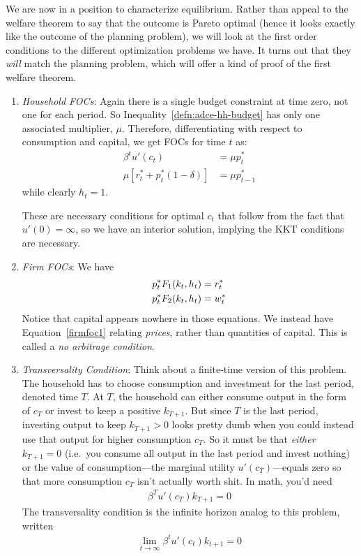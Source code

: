 \documentclass[12pt]{article}
\theoremstyle{plain}
\theoremstyle{definition}
\theoremstyle{remark}
\newcommand{\limt}{\lim_{t\rightarrow\infty}}
\begin{document}
We are now in a position to characterize equilibrium. Rather than appeal
to the welfare theorem to say that the outcome is Pareto optimal (hence
it looks exactly like the outcome of the planning problem), we will look
at the first order conditions to the different optimization problems we
have. It turns out that they \emph{will} match the planning problem,
which will offer a kind of proof of the first welfare theorem.
\begin{enumerate}
  \item \emph{Household FOCs}: Again there is a single budget
    constraint at time zero, not one for each period. So
    Inequality~\ref{defn:adce-hh-budget} has only one associated
    multiplier, $\mu$. Therefore, differentiating with respect to
    consumption and capital, we get FOCs for time $t$ as:
    \begin{align}
      \beta^t u'(c_t) &= \mu p_t^* \label{hhfoc1}\\
      \mu[r_t^* + p_t^* (1-\delta)]
      &= \mu p_{t-1}^* \label{hhfoc2}
    \end{align}
    while clearly $h_t=1$.

    These are necessary conditions for optimal $c_t$ that follow from
    the fact that $u'(0)=\infty$, so we have an interior solution,
    implying the KKT conditions are necessary.

  \item \emph{Firm FOCs}: We have
    \begin{align}
      p^*_t F_1(k_t,h_t) &= r_t^* \label{firmfoc1}\\
      p^*_t F_2(k_t,h_t) &= w_t^* \notag
    \end{align}
    Notice that capital appears nowhere in those equations.
    We instead have Equation~\ref{firmfoc1} relating \emph{prices},
    rather than quantities of capital. This is called a
    \emph{no arbitrage condition}.

  \item \emph{Transversality Condition}:
    Think about a finite-time version of this problem. The household has
    to choose consumption and investment for the last period, denoted
    time $T$. At $T$, the household can either consume output in the
    form of $c_T$ or invest to keep a positive $k_{T+1}$. But since $T$
    is the last period, investing output to keep $k_{T+1}>0$ looks
    pretty dumb when you could instead use that output for higher
    consumption $c_T$.  So it must be that \emph{either} $k_{T+1}=0$
    (i.e.\ you consume all output in the last period and invest nothing)
    or the value of consumption---the marginal utility
    $u'(c_T)$---equals zero so that more consumption $c_T$ isn't
    actually worth shit. In math, you'd need
    \begin{align*}
      \beta^{T} u'(c_T) k_{T+1} = 0
    \end{align*}
    The transversality condition is the infinite horizon analog to this
    problem, written
    \begin{align*}
      \limt \beta^t u'(c_t) k_{t+1}=0
    \end{align*}


\end{enumerate}
\end{document}
